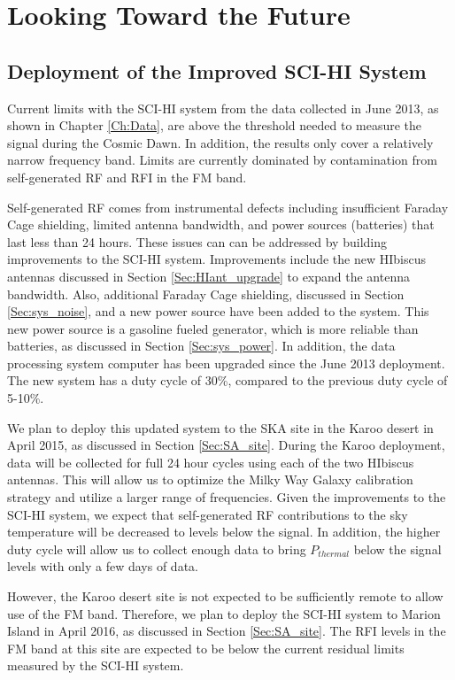 \chapter{Looking Toward the Future}\label{Ch:Conclude}

\section{Deployment of the Improved SCI-HI System}

Current limits with the SCI-HI system from the data collected in June 2013, as shown in Chapter \ref{Ch:Data}, are above the threshold needed to measure the \cm signal during the Cosmic Dawn. In addition, the results only cover a relatively narrow frequency band. Limits are currently dominated by contamination from self-generated RF and RFI in the FM band. 

Self-generated RF comes from instrumental defects including insufficient Faraday Cage shielding, limited antenna bandwidth, and power sources (batteries) that last less than 24 hours. These issues can can be addressed by building improvements to the SCI-HI system. Improvements include the new HIbiscus antennas discussed in Section \ref{Sec:HIant_upgrade} to expand the antenna bandwidth. Also, additional Faraday Cage shielding, discussed in Section \ref{Sec:sys_noise}, and a new power source have been added to the system. This new power source is a gasoline fueled generator, which is more reliable than batteries, as discussed in Section \ref{Sec:sys_power}. In addition, the data processing system computer has been upgraded since the June 2013 deployment. The new system has a duty cycle of 30\%, compared to the previous duty cycle of 5-10\%.  

We plan to deploy this updated system to the SKA site in the Karoo desert in April 2015, as discussed in Section \ref{Sec:SA_site}. During the Karoo deployment, data will be collected for full 24 hour cycles using each of the two HIbiscus antennas. This will allow us to optimize the Milky Way Galaxy calibration strategy and utilize a larger range of frequencies. Given the improvements to the SCI-HI system, we expect that self-generated RF contributions to the sky temperature will be decreased to levels below the \cm signal. In addition, the higher duty cycle will allow us to collect enough data to bring $P_{thermal}$ below the \cm signal levels with only a few days of data. 

However, the Karoo desert site is not expected to be sufficiently remote to allow use of the FM band. Therefore, we plan to deploy the SCI-HI system to Marion Island in April 2016, as discussed in Section \ref{Sec:SA_site}. The RFI levels in the FM band at this site are expected to be below the current residual limits measured by the SCI-HI system. 

